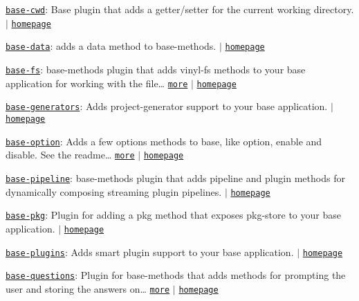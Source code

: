 \begin{DoxyItemize}
\item \href{https://www.npmjs.com/package/base-cwd}{\tt base-\/cwd}\+: Base plugin that adds a getter/setter for the current working directory. $\vert$ \href{https://github.com/node-base/base-cwd}{\tt homepage}
\item \href{https://www.npmjs.com/package/base-data}{\tt base-\/data}\+: adds a {\ttfamily data} method to base-\/methods. $\vert$ \href{https://github.com/node-base/base-data}{\tt homepage}
\item \href{https://www.npmjs.com/package/base-fs}{\tt base-\/fs}\+: base-\/methods plugin that adds vinyl-\/fs methods to your \textquotesingle{}base\textquotesingle{} application for working with the file… \href{https://github.com/node-base/base-fs}{\tt more} $\vert$ \href{https://github.com/node-base/base-fs}{\tt homepage}
\item \href{https://www.npmjs.com/package/base-generators}{\tt base-\/generators}\+: Adds project-\/generator support to your {\ttfamily base} application. $\vert$ \href{https://github.com/node-base/base-generators}{\tt homepage}
\item \href{https://www.npmjs.com/package/base-option}{\tt base-\/option}\+: Adds a few options methods to base, like {\ttfamily option}, {\ttfamily enable} and {\ttfamily disable}. See the readme… \href{https://github.com/node-base/base-option}{\tt more} $\vert$ \href{https://github.com/node-base/base-option}{\tt homepage}
\item \href{https://www.npmjs.com/package/base-pipeline}{\tt base-\/pipeline}\+: base-\/methods plugin that adds pipeline and plugin methods for dynamically composing streaming plugin pipelines. $\vert$ \href{https://github.com/node-base/base-pipeline}{\tt homepage}
\item \href{https://www.npmjs.com/package/base-pkg}{\tt base-\/pkg}\+: Plugin for adding a {\ttfamily pkg} method that exposes pkg-\/store to your base application. $\vert$ \href{https://github.com/node-base/base-pkg}{\tt homepage}
\item \href{https://www.npmjs.com/package/base-plugins}{\tt base-\/plugins}\+: Adds \textquotesingle{}smart plugin\textquotesingle{} support to your base application. $\vert$ \href{https://github.com/node-base/base-plugins}{\tt homepage}
\item \href{https://www.npmjs.com/package/base-questions}{\tt base-\/questions}\+: Plugin for base-\/methods that adds methods for prompting the user and storing the answers on… \href{https://github.com/node-base/base-questions}{\tt more} $\vert$ \href{https://github.com/node-base/base-questions}{\tt homepage}

\end{DoxyItemize}
